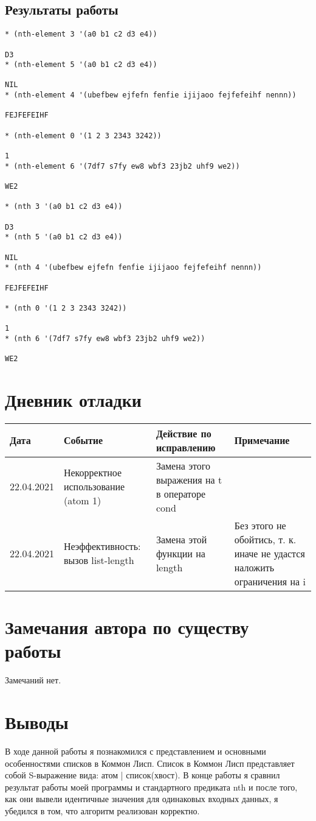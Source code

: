 \documentclass[12pt]{article}
\begin{document}
\subsection{Результаты работы}
\begin{verbatim}
* (nth-element 3 '(a0 b1 c2 d3 e4))

D3
* (nth-element 5 '(a0 b1 c2 d3 e4)) 

NIL
* (nth-element 4 '(ubefbew ejfefn fenfie ijijaoo fejfefeihf nennn))

FEJFEFEIHF

* (nth-element 0 '(1 2 3 2343 3242))

1
* (nth-element 6 '(7df7 s7fy ew8 wbf3 23jb2 uhf9 we2))

WE2

* (nth 3 '(a0 b1 c2 d3 e4))

D3
* (nth 5 '(a0 b1 c2 d3 e4))

NIL
* (nth 4 '(ubefbew ejfefn fenfie ijijaoo fejfefeihf nennn))

FEJFEFEIHF

* (nth 0 '(1 2 3 2343 3242))

1
* (nth 6 '(7df7 s7fy ew8 wbf3 23jb2 uhf9 we2))

WE2
\end{verbatim}

\section{Дневник отладки}
\begin{tabular}{|p{50pt}|p{130pt}|p{130pt}|p{70pt}|}
\hline
Дата & Событие & Действие по исправлению & Примечание \\ \hline
22.04.2021 & Некорректное использование (atom 1) & Замена этого выражения на t в операторе cond &\\ \hline
22.04.2021 & Неэффективность: вызов list-length & Замена этой функции на length & Без этого не обойтись, т. к. иначе не удастся наложить ограничения на i \\
\hline
\end{tabular}

\section{Замечания автора по существу работы}
Замечаний нет.

\section{Выводы}
В ходе данной работы я познакомился с представлением и основными особенностями списков в Коммон Лисп. Список в Коммон Лисп представляет собой S-выражение вида: атом | список(хвост). В конце работы я сравнил результат работы моей программы и стандартного предиката nth и после того, как они вывели идентичные значения для одинаковых входных данных, я убедился в том, что алгоритм реализован корректно.
\end{document}
